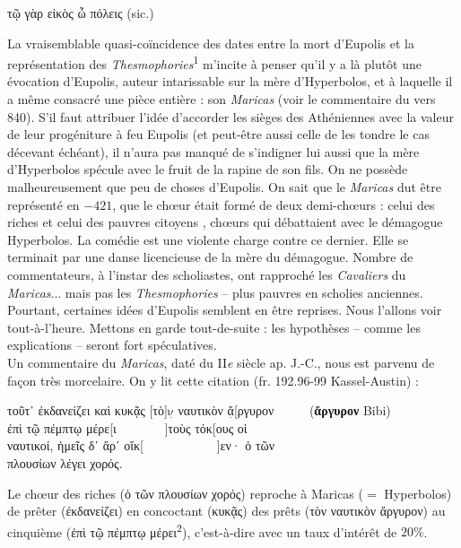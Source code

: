 \documentclass[12pt]{book}%
\newcommand{\italique}[1]{\textit{#1}}%
\newcommand{\citComm}[1]{\begin{quoting}[vskip=0pt] #1 \end{quoting}}%
\newcommand{\nieme}[1]{#1\italique{e}}%
\newcommand{\douteux}[1]{$\underset{\cdot}{\text{#1}}$}
\newcommand{\marqueur}[1]{\textsuperscript{#1}}%
\newenvironment{groupe}{%
\pstart%
\ledgroup%
}{%
\pend %
}%
\begin{document}
\begin{pages}
\begin{Leftside}
\begin{groupe}
{{\citComm{τῷ γὰρ εἰκὸς ὦ πόλεις (sic.)}%
La vraisemblable quasi-coïncidence des dates entre la mort d'Eupolis et la représentation des \italique{Thesmophories}\marqueur{1} m'incite à penser qu'il y a là plutôt une évocation d'Eupolis, auteur intarissable sur la mère d'Hyperbolos, et à laquelle il a même consacré une pièce entière : son \italique{Maricas} (voir le commentaire du vers 840).
S'il faut attribuer l'idée d'accorder les sièges des Athéniennes avec la valeur de leur progéniture à feu Eupolis (et peut-être aussi celle de les tondre le cas décevant échéant), il n'aura pas manqué de s'indigner lui aussi que la mère d'Hyperbolos spécule avec le fruit de la rapine de son fils. 
On ne possède malheureusement que peu de choses d'Eupolis. %
On sait que le \italique{Maricas} dut être représenté en $-421$, que le chœur était formé de deux demi-chœurs : celui des riches et celui des pauvres citoyens%
, chœurs qui débattaient avec le démagogue Hyperbolos.
La comédie est une violente charge contre ce dernier.
Elle se terminait par une danse licencieuse de la mère du démagogue.
Nombre de commentateurs, à l'instar des scholiastes, ont rapproché les \italique{Cavaliers} du \italique{Maricas}... mais pas les \italique{Thesmophories} -- plus pauvres en scholies anciennes.
Pourtant, certaines idées d'Eupolis semblent en être reprises. Nous l'allons voir tout-à-l'heure.
Mettons en garde tout-de-suite : les hypothèses -- comme les explications -- seront fort spéculatives.\\
Un commentaire du \italique{Maricas}, daté du \nieme{II} siècle ap. J.-C., nous est parvenu de façon très morcelaire. On y lit cette citation (fr. 192.96-99 Kassel-Austin) :%
\citComm{τοῦτ᾽ ἐκδανείζει καὶ κυκᾷς [τὸ]\douteux{ν} ναυτικὸν \douteux{ἄ}[ργυρον \ \ \ \ \ (\textbf{ἄργυρον} Bibi)\\
ἐπὶ τῷ πέμπτῳ μέρε[ι \ \ \ \ \ \ \ ]τοὺς τόκ[ους οἱ\\
ναυτικοί, ἡμεῖς δ᾽ ἄρ᾽ οἴκ[ \ \ \ \ \ \ \ \ \ \ \ ]εν· ὁ τῶν\\
πλουσίων λέγει χορός.}%
Le chœur des riches (ὁ τῶν πλουσίων χορός) reproche à Maricas ($=$ Hyperbolos) de prêter (ἐκδανείζει) en concoctant (κυκᾷς) des prêts (τὸν ναυτικὸν ἄργυρον) au cinquième (ἐπὶ τῷ πέμπτῳ μέρει\marqueur{2}), c'est-à-dire avec un taux d'intérêt de $20 \%$.
}}
\end{groupe}
\end{Leftside}
\end{pages}
\end{document}
